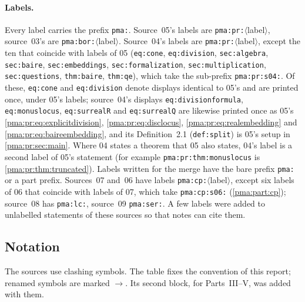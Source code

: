 \documentclass[11pt]{article}
\numberwithin{equation}{section}
\theoremstyle{definition}
\theoremstyle{remark}
\begin{document}
\paragraph{Labels.} Every label carries the prefix \texttt{pma:}. Source~05's
labels are \texttt{pma:pr:}$\langle$label$\rangle$, source~03's are
\texttt{pma:bor:}$\langle$label$\rangle$. Source~04's labels are
\texttt{pma:pr:}$\langle$label$\rangle$, except the ten that coincide with
labels of 05 (\texttt{eq:cone}, \texttt{eq:division}, \texttt{sec:algebra},
\texttt{sec:baire}, \texttt{sec:embeddings}, \texttt{sec:formalization},
\texttt{sec:multiplication}, \texttt{sec:questions}, \texttt{thm:baire},
\texttt{thm:qe}), which take the sub-prefix \texttt{pma:pr:s04:}. Of these,
\texttt{eq:cone} and \texttt{eq:division} denote displays identical to 05's
and are printed once, under 05's labels; source~04's displays
\texttt{eq:divisionformula}, \texttt{eq:monuslocus}, \texttt{eq:surrealR} and
\texttt{eq:surrealQ} are likewise printed once as 05's
\eqref{pma:pr:eq:explicitdivision}, \eqref{pma:pr:eq:disclocus},
\eqref{pma:pr:eq:realembedding} and \eqref{pma:pr:eq:baireembedding}, and its
Definition~2.1 (\texttt{def:split}) is 05's setup in \cref{pma:pr:sec:main}.
Where 04 states a theorem that 05 also states, 04's label is a second label of
05's statement (for example \texttt{pma:pr:thm:monuslocus} is
\cref{pma:pr:thm:truncated}). Labels written for the merge have the bare
prefix \texttt{pma:} or a part prefix. Sources~07 and~06 have labels
\texttt{pma:cp:}$\langle$label$\rangle$, except six labels of 06 that coincide
with labels of 07, which take \texttt{pma:cp:s06:}
(\cref{pma:part:cp}); source~08 has \texttt{pma:lc:}, source~09
\texttt{pma:ser:}. A few labels were added to unlabelled statements of these
sources so that notes can cite them.

\subsection{Notation}\label{pma:sec:notation}

The sources use clashing symbols. The table fixes the convention of
this report; renamed symbols are marked $\to$. Its second block, for
Parts~III--V, was added with them.
\end{document}
